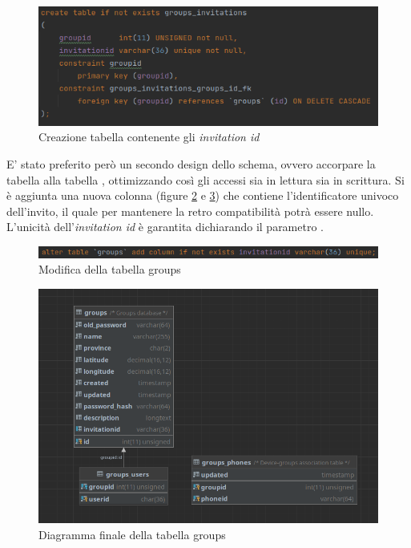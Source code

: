 \documentclass[main.tex]{subfiles}
\begin{document}
\begin{figure}[H]
    \centering
    \includegraphics[width=1\linewidth]{img/add-link-task/invitation-first-code.png}
    \caption{Creazione tabella contenente gli \emph{invitation id}}
    \label{fig:invitation-first-code}
\end{figure}

E' stato preferito però un secondo design dello schema, ovvero accorpare la tabella  alla tabella , ottimizzando così gli accessi sia in lettura sia in scrittura. Si è aggiunta una nuova colonna  (figure \ref{fig:invitation-final-code} e \ref{fig:invitation-final}) che contiene l'identificatore univoco dell'invito, il quale per mantenere la retro compatibilità potrà essere nullo. L'unicità dell'\emph{invitation id} è garantita dichiarando il parametro .

\begin{figure}[H]
    \centering
    \includegraphics[width=1\linewidth]{img/add-link-task/invite-final.png}
    \caption{Modifica della tabella groups}
    \label{fig:invitation-final-code}
\end{figure}

\begin{figure}[H]
    \centering
    \includegraphics[width=1\linewidth]{img/add-link-task/invite-final-diagram.png}
    \caption{Diagramma finale della tabella groups}
    \label{fig:invitation-final}
\end{figure}
\end{document}
